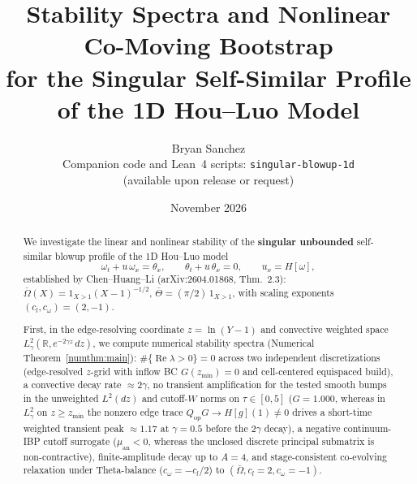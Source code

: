 \documentclass[11pt,a4paper]{article}
\title{Stability Spectra and Nonlinear Co-Moving Bootstrap\\
for the Singular Self-Similar Profile of the 1D Hou--Luo Model}
\author{
  Bryan Sanchez\\
  \small Companion code and Lean~4 scripts: \texttt{singular-blowup-1d}\\
  \small (available upon release or request)
}
\date{November 2026}
\begin{document}
\maketitle

\begin{abstract}
We investigate the linear and nonlinear stability of the \textbf{singular unbounded}
self-similar blowup profile of the 1D Hou--Luo model
\[
\omega_t + u\,\omega_x = \theta_x,\qquad
\theta_t + u\,\theta_x = 0,\qquad
u_x = H[\omega],
\]
established by Chen--Huang--Li (arXiv:2604.01868, Thm.~2.3):
$\bar\Omega(X)=1_{X>1}(X-1)^{-1/2}$, $\bar\Theta=(\pi/2)\,1_{X>1}$, with scaling exponents
$(c_l,c_\omega)=(2,-1)$.

First, in the edge-resolving coordinate $z=\ln(Y-1)$ and convective weighted space
$L^2_\gamma(\mathbb{R}, e^{-2\gamma z}\,dz)$, we compute numerical stability spectra
(Numerical Theorem~\ref{numthm:main}): $\#\{\operatorname{Re}\lambda>0\}=0$ across two
independent discretizations (edge-resolved $z$-grid with inflow BC $G(z_{\min})=0$ and cell-centered
equispaced build), a convective decay rate $\approx 2\gamma$, no transient amplification for the tested smooth bumps in the unweighted $L^2(dz)$ and cutoff-$W$
norms on $\tau\in[0,5]$ ($G=1.000$, whereas in $L^2_\gamma$ on $z\ge z_{\min}$ the nonzero edge
trace $Q_{\mathrm{op}}G\to H[g](1)\ne 0$ drives a short-time weighted transient peak $\approx 1.17$
at $\gamma=0.5$ before the $2\gamma$ decay), a negative continuum-IBP cutoff surrogate
($\mu_{\mathrm{an}}<0$, whereas the unclosed discrete principal submatrix is non-contractive), finite-amplitude decay up to
$A=4$, and stage-consistent co-evolving relaxation under Theta-balance ($c_\omega=-c_l/2$) to
$(\bar\Omega,c_l=2,c_\omega=-1)$.


\end{abstract}
\end{document}
